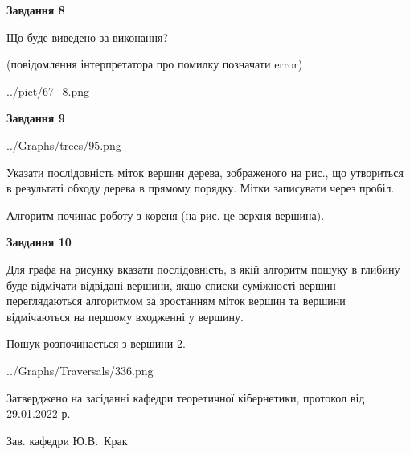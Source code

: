 \documentclass[12pt, ukrainian]{article}
\begin{document}
{\begin {large}
{\begin {center}\textbf{Завдання 8}\end {center}}\par
Що буде виведено за виконання?\par
 (повідомлення інтерпретатора про помилку позначати error)\par
\begin{center}
	{../pict/67_8.png}
\end{center}
\newpage

{\begin {center}\textbf{Завдання 9}\end {center}}\par

\begin{center}
	{../Graphs/trees/95.png}
\end{center}
Указати послідовність міток вершин дерева, зображеного на рис., що утвориться в результаті обходу дерева в прямому порядку. Мітки записувати через пробіл.\par Алгоритм починає роботу з кореня (на рис. це верхня вершина).\par
\newpage

{\begin {center}\textbf{Завдання 10}\end {center}}\par
Для графа на рисунку вказати послідовність, в якій алгоритм пошуку в глибину буде відмічати відвідані вершини, якщо списки суміжності вершин переглядаються алгоритмом за зростанням міток вершин та вершини відмічаються на першому вход\-женні у вершину.\par
Пошук розпочинається з вершини 2.\par

\begin{center}
	{../Graphs/Traversals/336.png}
\end{center}\par
\newpage


\end {large}
}
{\smallskip \begin {small} Затверджено на засіданні кафедри теоретичної кібернетики, протокол  від   29.01.2022 р.\par\smallskip\smallskip
{\parbox {6.5 cm}{Зав. кафедри \dotfill Ю.В.~Крак}} \end{small}}
\end{document}
